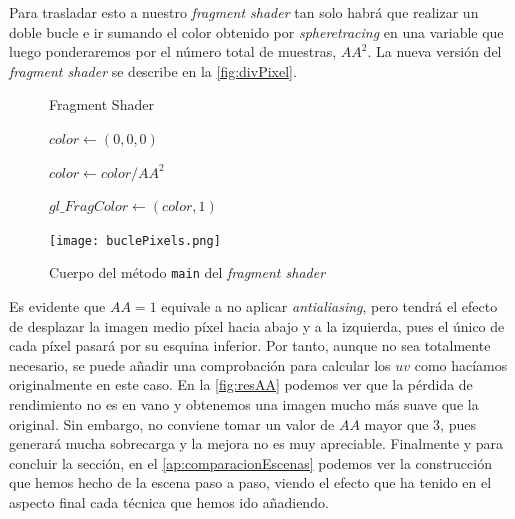 Para trasladar esto a nuestro \textit{fragment shader} tan solo habrá que realizar un doble bucle e ir sumando el color obtenido por \textit{spheretracing} en una variable que luego ponderaremos por el número total de muestras, $AA^2$. La nueva versión del \textit{fragment shader} se describe en la \autoref{fig:divPixel}.

\begin{figure}[ht!]
    \centering
    \begin{minipage}{0.69\textwidth}
      \begin{algorithm}[H]
            \caption{Fragment Shader}
            $color\gets (0,0,0)$
            

            $color \gets color / AA^2$
            
            $gl\_FragColor \gets (color, 1)$
        \end{algorithm}
    \end{minipage}%
    \hfill
    \begin{minipage}{0.31\textwidth}
        \texttt{[image: buclePixels.png]}
    \end{minipage}
    \caption{Cuerpo del método \texttt{main} del \textit{fragment shader}}
    \label{fig:divPixel}
\end{figure}

Es evidente que $AA=1$ equivale a no aplicar \textit{antialiasing}, pero tendrá el efecto de desplazar la imagen medio píxel hacia abajo y a la izquierda, pues el único de cada píxel pasará por su esquina inferior. Por tanto, aunque no sea totalmente necesario, se puede añadir una comprobación para calcular los $uv$ como hacíamos originalmente en este caso. En la \autoref{fig:resAA} podemos ver que la pérdida de rendimiento no es en vano y obtenemos una imagen mucho más suave que la original. Sin embargo, no conviene tomar un valor de $AA$ mayor que $3$, pues generará mucha sobrecarga y la mejora no es muy apreciable. Finalmente y para concluir la sección, en el \autoref{ap:comparacionEscenas} podemos ver la construcción que hemos hecho de la escena paso a paso, viendo el efecto que ha tenido en el aspecto final cada técnica que hemos ido añadiendo.

